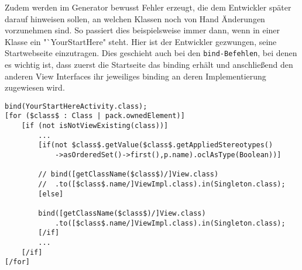 Zudem werden im Generator bewusst Fehler erzeugt, die dem Entwickler später darauf hinweisen sollen, an welchen Klassen noch von Hand Änderungen vorzunehmen sind. So passiert dies beispielsweise immer dann, wenn in einer Klasse ein "`YourStartHere" steht. Hier ist der Entwickler gezwungen, seine Startwebseite einzutragen. Dies geschieht auch bei den \texttt{bind-Befehlen}, bei denen es wichtig ist, dass zuerst die Startseite das binding erhält und anschließend den anderen View Interfaces ihr jeweiliges binding an deren Implementierung zugewiesen wird.
\lstset{language=mtl}
\begin{lstlisting}[caption={Auszug aus der Generierung des \texttt{bind}-Befehls}, label={BSPCodeBind}]
bind(YourStartHereActivity.class);  
[for ($class$ : Class | pack.ownedElement)]
	[if (not isNotViewExisting(class))]
		...
		[if(not $class$.getValue($class$.getAppliedStereotypes()
			->asOrderedSet()->first(),p.name).oclAsType(Boolean))]

		// bind([getClassName($class$)/]View.class)
		//	.to([$class$.name/]ViewImpl.class).in(Singleton.class);
		[else]

		bind([getClassName($class$)/]View.class)
			.to([$class$.name/]ViewImpl.class).in(Singleton.class);
		[/if]		
		...
	[/if]	
[/for]
\end{lstlisting}

